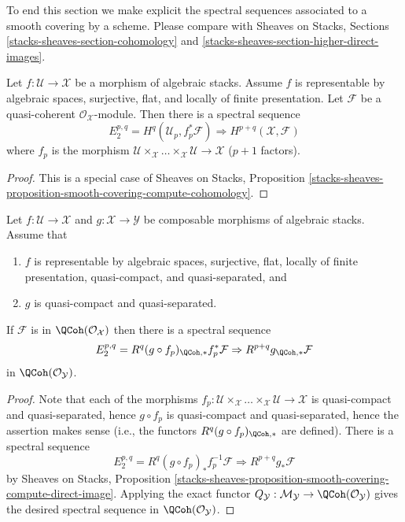 \noindent
To end this section we make explicit the spectral sequences
associated to a smooth covering by a scheme. Please compare with
Sheaves on Stacks, Sections \ref{stacks-sheaves-section-cohomology} and
\ref{stacks-sheaves-section-higher-direct-images}.

\begin{proposition}
\label{proposition-smooth-covering-compute-cohomology}
Let $f : \mathcal{U} \to \mathcal{X}$ be a morphism of algebraic stacks.
Assume $f$ is representable by algebraic spaces, surjective, flat, and
locally of finite presentation. Let $\mathcal{F}$ be a quasi-coherent
$\mathcal{O}_\mathcal{X}$-module. Then there is a spectral sequence
$$
E_2^{p, q} = H^q(\mathcal{U}_p, f_p^*\mathcal{F})
\Rightarrow
H^{p + q}(\mathcal{X}, \mathcal{F})
$$
where $f_p$ is the morphism
$\mathcal{U} \times_\mathcal{X} \ldots \times_\mathcal{X} \mathcal{U} \to
\mathcal{X}$ ($p + 1$ factors).
\end{proposition}

\begin{proof}
This is a special case of
Sheaves on Stacks, Proposition
\ref{stacks-sheaves-proposition-smooth-covering-compute-cohomology}.
\end{proof}

\begin{proposition}
\label{proposition-smooth-covering-compute-direct-image}
Let $f : \mathcal{U} \to \mathcal{X}$ and $g : \mathcal{X} \to \mathcal{Y}$
be composable morphisms of algebraic stacks.
Assume that
\begin{enumerate}
\item $f$ is representable by algebraic spaces, surjective,
flat, locally of finite presentation, quasi-compact, and quasi-separated, and
\item $g$ is quasi-compact and quasi-separated.
\end{enumerate}
If $\mathcal{F}$ is in $\QCoh(\mathcal{O}_\mathcal{X})$ then
there is a spectral sequence
$$
E_2^{p, q} = R^q(g \circ f_p)_{\QCoh, *}f_p^*\mathcal{F}
\Rightarrow
R^{p + q}g_{\QCoh, *}\mathcal{F}
$$
in $\QCoh(\mathcal{O}_\mathcal{Y})$.
\end{proposition}

\begin{proof}
Note that each of the morphisms
$f_p : \mathcal{U} \times_\mathcal{X} \ldots \times_\mathcal{X} \mathcal{U} \to
\mathcal{X}$ is quasi-compact and quasi-separated, hence $g \circ f_p$
is quasi-compact and quasi-separated, hence the assertion makes sense
(i.e., the functors $R^q(g \circ f_p)_{\QCoh, *}$ are defined).
There is a spectral sequence
$$
E_2^{p, q} = R^q(g \circ f_p)_*f_p^{-1}\mathcal{F}
\Rightarrow
R^{p + q}g_*\mathcal{F}
$$
by Sheaves on Stacks, Proposition
\ref{stacks-sheaves-proposition-smooth-covering-compute-direct-image}.
Applying the exact functor
$Q_\mathcal{Y} : \mathcal{M}_\mathcal{Y} \to
\QCoh(\mathcal{O}_\mathcal{Y})$ gives the desired spectral sequence in
$\QCoh(\mathcal{O}_\mathcal{Y})$.
\end{proof}







